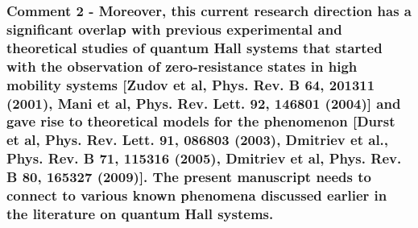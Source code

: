 \documentclass{article}
\begin{document}
\subsubsection*{Comment 2 -
\color{RoyalBlue} Moreover, this current research direction has a significant overlap with previous experimental and theoretical studies of quantum Hall systems that started with the observation of zero-resistance states in high mobility systems [Zudov et al, Phys. Rev. B 64, 201311 (2001), Mani et al, Phys. Rev. Lett. 92, 146801 (2004)] and gave rise to theoretical models for the phenomenon [Durst et al, Phys. Rev. Lett. 91, 086803 (2003), Dmitriev et al., Phys. Rev. B 71, 115316 (2005), Dmitriev et al, Phys. Rev. B 80, 165327 (2009)]. The present manuscript needs to connect to various known phenomena discussed earlier in the literature on quantum Hall systems.}
\end{document}
